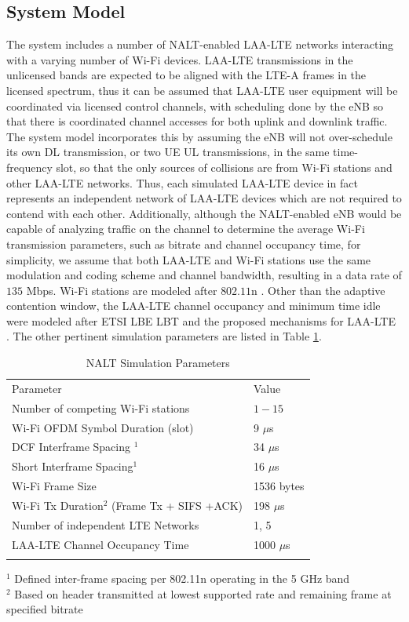 \subsection{System Model}
\label{sys-model}
The system includes a number of NALT-enabled LAA-LTE networks interacting with a varying number of Wi-Fi devices.  LAA-LTE transmissions in the unlicensed bands are expected to be aligned with the LTE-A frames in the licensed spectrum, thus it can be assumed that \mbox{LAA-LTE} user equipment will be coordinated via licensed control channels, with scheduling done by the eNB so that there is coordinated channel accesses for both uplink and downlink traffic.  The system model incorporates this by assuming the eNB will not over-schedule its own DL transmission, or two UE UL transmissions, in the same time-frequency slot, so that the only sources of collisions are from Wi-Fi stations and other LAA-LTE networks. Thus, each simulated LAA-LTE device in fact represents an independent network of LAA-LTE devices which are not required to contend with each other. Additionally, although the NALT-enabled eNB would be capable of analyzing traffic on the channel to determine the average Wi-Fi transmission parameters, such as bitrate and channel occupancy time, for simplicity, we assume that both \mbox{LAA-LTE} and \mbox{Wi-Fi} stations use the same modulation and coding scheme and channel bandwidth, resulting in a data rate of $135$ Mbps.  Wi-Fi stations are modeled after $802.11$n \cite{80211}.  Other than the adaptive contention window, the LAA-LTE channel occupancy and minimum time idle were modeled after ETSI LBE LBT and the proposed mechanisms for \mbox{LAA-LTE} \cite{3gpp}.  The other pertinent simulation parameters are listed in Table \ref{params}.
\begin{table}
	\caption{NALT Simulation Parameters}
	\label{params}      
	\begin{tabular}{p{}p{}}
		\hline\noalign{\smallskip}
		Parameter & Value \\
		\noalign{\smallskip}\svhline\noalign{\smallskip}
		Number of competing \mbox{Wi-Fi} stations& $1 - 15$ \\ 
		Wi-Fi OFDM Symbol Duration (slot) & 9 $\mu$s    \\ 
		DCF Interframe Spacing $^1$ & 34 $\mu$s   \\ 
		Short Interframe Spacing$^1$ & 16 $\mu$s   \\ 
		\mbox{Wi-Fi} Frame Size & 1536 bytes  \\ 
		\mbox{Wi-Fi} Tx Duration$^2$ (Frame Tx + SIFS +ACK) & 198 $\mu$s   \\ 
		Number of independent LTE Networks & 1, 5 \\
		\mbox{LAA-LTE} Channel Occupancy Time  & 1000 $\mu$s \\ 	
		\noalign{\smallskip}\hline\noalign{\smallskip}
	\end{tabular}
	$^1$ Defined inter-frame spacing per 802.11n operating in the 5 GHz band \\
	$^2$ Based on header transmitted at lowest supported rate and remaining frame at specified bitrate	 
\end{table}

